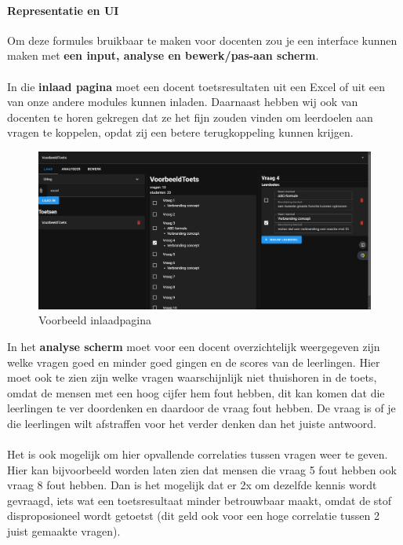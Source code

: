 \documentclass[12pt]{article}
\begin{document}
\pagebreak
\begin{multicols}{2}
\paragraph*{Representatie en UI} Om deze formules bruikbaar te maken voor docenten zou je een interface kunnen maken met \textbf{een input, analyse en bewerk/pas-aan scherm}.\\\\
In die \textbf{inlaad pagina} moet een docent toetsresultaten uit een Excel of uit een van onze andere modules kunnen inladen. Daarnaast hebben wij ook van docenten te horen gekregen dat ze het fijn zouden vinden om leerdoelen aan vragen te koppelen, opdat zij een betere terugkoppeling kunnen krijgen.%
\begin{figure}[H]
    \centering
    \includegraphics[width=1\linewidth]{./images/methoden/analyseren/ui/inlaad-pagina.png}
    \caption{Voorbeeld inlaadpagina}
    \label{fig:enter-label}
\end{figure}
\noindent In het \textbf{analyse scherm} moet voor een docent overzichtelijk weergegeven zijn welke vragen goed en minder goed gingen en de scores van de leerlingen. Hier moet ook te zien zijn welke vragen waarschijnlijk niet thuishoren in de toets, omdat de mensen met een hoog cijfer hem fout hebben, dit kan komen dat die leerlingen te ver doordenken en daardoor de vraag fout hebben. De vraag is of je die leerlingen wilt afstraffen voor het verder denken dan het juiste antwoord. \\
\\
Het is ook mogelijk om hier opvallende correlaties tussen vragen weer te geven. Hier kan bijvoorbeeld worden laten zien dat mensen die vraag 5 fout hebben ook vraag 8 fout hebben. Dan is het mogelijk dat er 2x om dezelfde kennis wordt gevraagd, iets wat een toetsresultaat minder betrouwbaar maakt, omdat de stof disproposioneel wordt getoetst (dit geld ook voor een hoge correlatie tussen 2 juist gemaakte vragen). \\

\end{multicols}
\end{document}
